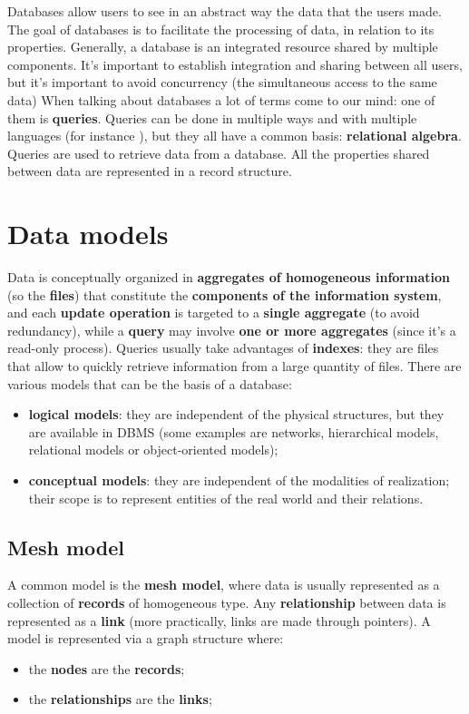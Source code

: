 Databases allow users to see in an abstract way the data that the users made. The goal of databases is to facilitate the processing of data, in relation to its properties. Generally, a database is an integrated resource shared by multiple components. It's important to establish integration and sharing between all users, but it's important to avoid concurrency (the simultaneous access to the same data)
\nwl
When talking about databases a lot of terms come to our mind: one of them is \textbf{queries}. Queries can be done in multiple ways and with multiple languages (for instance ), but they all have a common basis: \textbf{relational algebra}. Queries are used to retrieve data from a database. All the properties shared between data are represented in a record structure.

\section{Data models}

Data is conceptually organized in \textbf{aggregates of homogeneous information} (so the \textbf{files}) that constitute the \textbf{components of the information system}, and each \textbf{update operation} is targeted to a \textbf{single aggregate} (to avoid redundancy), while a \textbf{query} may involve \textbf{one or more aggregates} (since it's a read-only process). Queries usually take advantages of \textbf{indexes}: they are files that allow to quickly retrieve information from a large quantity of files.
\nwl
There are various models that can be the basis of a database:
\begin{itemize}
    \item \textbf{logical models}: they are independent of the physical structures, but they are available in DBMS (some examples are networks, hierarchical models, relational models or object-oriented models);
    \item \textbf{conceptual models}: they are independent of the modalities of realization; their scope is to represent entities of the real world and their relations.
\end{itemize}

\subsection{Mesh model}

A common model is the \textbf{mesh model}, where data is usually represented as a collection of \textbf{records} of homogeneous type. Any \textbf{relationship} between data is represented as a \textbf{link} (more practically, links are made through pointers).
\nwl
A model is represented via a graph structure where:
\begin{itemize}
    \item the \textbf{nodes} are the \textbf{records};
    \item the \textbf{relationships} are the \textbf{links};
\end{itemize}

